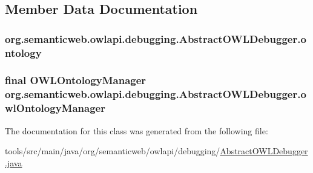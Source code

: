 \subsection{Member Data Documentation}
\hypertarget{classorg_1_1semanticweb_1_1owlapi_1_1debugging_1_1_abstract_o_w_l_debugger_a752fe8de84b07aa7d41877eb3a9e8167}{
\subsubsection[{ontology}]{ org.\-semanticweb.\-owlapi.\-debugging.\-Abstract\-O\-W\-L\-Debugger.\-ontology\hspace{0.3cm}{\ttfamily [private]}}}\label{classorg_1_1semanticweb_1_1owlapi_1_1debugging_1_1_abstract_o_w_l_debugger_a752fe8de84b07aa7d41877eb3a9e8167}
\hypertarget{classorg_1_1semanticweb_1_1owlapi_1_1debugging_1_1_abstract_o_w_l_debugger_a7949b6ba4646ecc943e0015467210946}{
\subsubsection[{owl\-Ontology\-Manager}]{\setlength{\rightskip}{0pt plus 5cm}final {\bf O\-W\-L\-Ontology\-Manager} org.\-semanticweb.\-owlapi.\-debugging.\-Abstract\-O\-W\-L\-Debugger.\-owl\-Ontology\-Manager\hspace{0.3cm}{\ttfamily [private]}}}\label{classorg_1_1semanticweb_1_1owlapi_1_1debugging_1_1_abstract_o_w_l_debugger_a7949b6ba4646ecc943e0015467210946}


The documentation for this class was generated from the following file\-:\begin{DoxyCompactItemize}
\item 
tools/src/main/java/org/semanticweb/owlapi/debugging/\hyperlink{_abstract_o_w_l_debugger_8java}{Abstract\-O\-W\-L\-Debugger.\-java}\end{DoxyCompactItemize}
